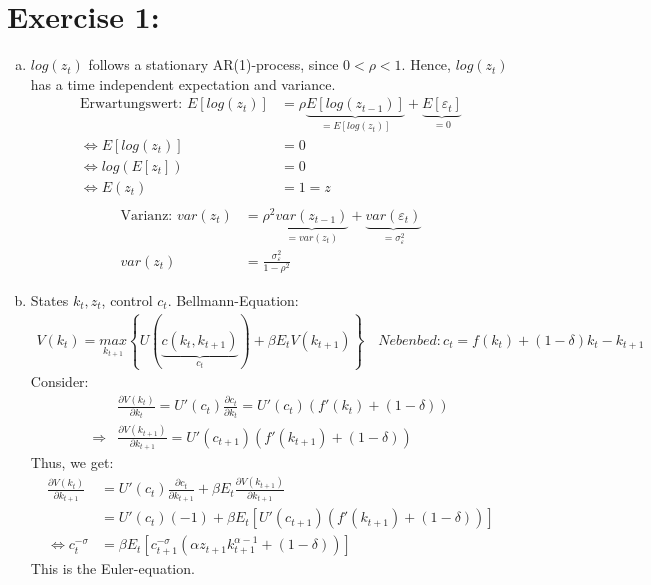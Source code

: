 \documentclass{article}
\begin{document}
\section*{Exercise 1: }

\begin{enumerate}[(a)]
  \item $log(z_t)$ follows a stationary AR(1)-process, since $0<\rho<1$.
      Hence, $log(z_t)$ has a time independent expectation and variance.
 \begin{align*}
\text{Erwartungswert: } E[log(z_t)] &= \rho \underbrace{E[log(z_{t-1})]}_{=E[log(z_t)]} + \underbrace{E[\varepsilon_t]}_{=0}\\
\Leftrightarrow E[log(z_t)] &= 0\\
\Leftrightarrow log(E[z_t]) &= 0 \\
\Leftrightarrow E(z_t) &= 1 = z\\
\end{align*}
\begin{align*}
\text{Varianz: } var(z_t) &= \rho^2 \underbrace{var(z_{t-1})}_{=var(z_{t})} + \underbrace{var(\varepsilon_t)}_{=\sigma_\varepsilon^2}\\
var(z_t) &= \frac{\sigma_\varepsilon^2}{1-\rho^2}
  \end{align*}

\item States $k_t, z_t$, control $c_t$. Bellmann-Equation:
    \begin{align*}
      V(k_t) = \underset{k_{t+1}}{max} \left\{U(\underbrace{c(k_t,k_{t+1})}_{c_t}) + \beta E_t V(k_{t+1})\right\} \quad Nebenbed: c_t = f(k_t) + (1-\delta)k_t - k_{t+1}
    \end{align*}
Consider:
\begin{align*}
  &\frac{\partial V(k_t)}{\partial k_{t}}=U'(c_t)\frac{\partial c_t}{\partial k_{t}} = U'(c_t)(f'(k_t)+(1-\delta))\\
\Rightarrow & \frac{\partial V(k_{t+1})}{\partial k_{t+1}}= U'(c_{t+1})(f'(k_{t+1})+(1-\delta))
\end{align*}
Thus, we get:
\begin{align*}
  \frac{\partial V(k_t)}{\partial k_{t+1}} &= U'(c_t) \frac{\partial c_t}{\partial k_{t+1}} + \beta E_t \frac{\partial V(k_{t+1})}{\partial k_{t+1}}\\
  &= U'(c_t)(-1) + \beta E_t \left[U'(c_{t+1})(f'(k_{t+1})+(1-\delta))\right]\\
\Leftrightarrow c_t^{-\sigma} &= \beta E_t \left[ c_{t+1}^{-\sigma} (\alpha z_{t+1} k_{t+1}^{\alpha-1} +(1-\delta)) \right]
\end{align*}
This is the Euler-equation.


\end{enumerate}
\end{document}
